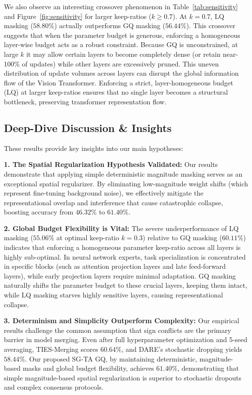 We also observe an interesting crossover phenomenon in Table~\ref{tab:sensitivity} and Figure~\ref{fig:sensitivity} for larger keep-ratios ($k \ge 0.7$). At $k=0.7$, LQ masking ($58.80\%$) actually outperforms GQ masking ($56.44\%$). This crossover suggests that when the parameter budget is generous, enforcing a homogeneous layer-wise budget acts as a robust constraint. Because GQ is unconstrained, at large $k$ it may allow certain layers to become completely dense (or retain near-100\% of updates) while other layers are excessively pruned. This uneven distribution of update volumes across layers can disrupt the global information flow of the Vision Transformer. Enforcing a strict, layer-homogeneous budget (LQ) at larger keep-ratios ensures that no single layer becomes a structural bottleneck, preserving transformer representation flow.

\subsection{Deep-Dive Discussion \& Insights}
\label{subsec:insights}
These results provide key insights into our main hypotheses:

\textbf{1. The Spatial Regularization Hypothesis Validated:}
Our results demonstrate that applying simple deterministic magnitude masking serves as an exceptional spatial regularizer. By eliminating low-magnitude weight shifts (which represent fine-tuning background noise), we effectively mitigate the representational overlap and interference that cause catastrophic collapse, boosting accuracy from $46.32\%$ to $61.40\%$.

\textbf{2. Global Budget Flexibility is Vital:}
The severe underperformance of LQ masking ($55.06\%$ at optimal keep-ratio $k=0.3$) relative to GQ masking ($60.11\%$) indicates that enforcing a homogeneous parameter keep-ratio across all layers is highly sub-optimal. In neural network experts, task specialization is concentrated in specific blocks (such as attention projection layers and late feed-forward layers), while early projection layers require minimal adaptation. GQ masking naturally shifts the parameter budget to these crucial layers, keeping them intact, while LQ masking starves highly sensitive layers, causing representational collapse.

\textbf{3. Determinism and Simplicity Outperform Complexity:}
Our empirical results challenge the common assumption that sign conflicts are the primary barrier in model merging. Even after full hyperparameter optimization and 5-seed averaging, TIES-Merging scores $60.64\%$, and DARE's stochastic dropping yields $58.44\%$. Our proposed SG-TA GQ, by maintaining deterministic, magnitude-based masks and global budget flexibility, achieves $61.40\%$, demonstrating that simple magnitude-based spatial regularization is superior to stochastic dropouts and complex consensus protocols.

